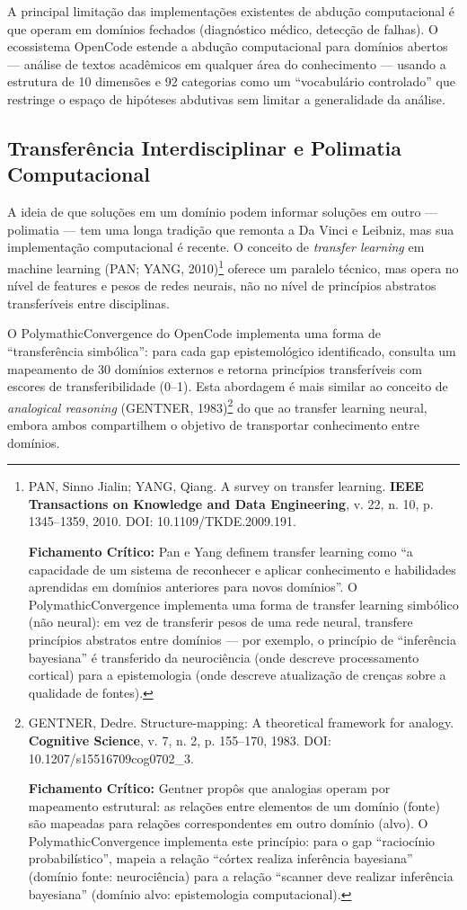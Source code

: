 A principal limitação das implementações existentes de abdução computacional é que operam em domínios fechados (diagnóstico médico, detecção de falhas). O ecossistema OpenCode estende a abdução computacional para domínios abertos --- análise de textos acadêmicos em qualquer área do conhecimento --- usando a estrutura de 10 dimensões e 92 categorias como um ``vocabulário controlado'' que restringe o espaço de hipóteses abdutivas sem limitar a generalidade da análise.

\subsection{Transferência Interdisciplinar e Polimatia Computacional}

A ideia de que soluções em um domínio podem informar soluções em outro --- polimatia --- tem uma longa tradição que remonta a Da Vinci e Leibniz, mas sua implementação computacional é recente. O conceito de \textit{transfer learning} em machine learning (PAN; YANG, 2010)\footnote{
  PAN, Sinno Jialin; YANG, Qiang. A survey on transfer learning. \textbf{IEEE Transactions on Knowledge and Data Engineering}, v. 22, n. 10, p. 1345--1359, 2010. DOI: 10.1109/TKDE.2009.191.

  \textbf{Fichamento Crítico:} Pan e Yang definem transfer learning como ``a capacidade de um sistema de reconhecer e aplicar conhecimento e habilidades aprendidas em domínios anteriores para novos domínios''. O PolymathicConvergence implementa uma forma de transfer learning simbólico (não neural): em vez de transferir pesos de uma rede neural, transfere princípios abstratos entre domínios --- por exemplo, o princípio de ``inferência bayesiana'' é transferido da neurociência (onde descreve processamento cortical) para a epistemologia (onde descreve atualização de crenças sobre a qualidade de fontes).
} oferece um paralelo técnico, mas opera no nível de features e pesos de redes neurais, não no nível de princípios abstratos transferíveis entre disciplinas.

O PolymathicConvergence do OpenCode implementa uma forma de ``transferência simbólica'': para cada gap epistemológico identificado, consulta um mapeamento de 30 domínios externos e retorna princípios transferíveis com escores de transferibilidade (0--1). Esta abordagem é mais similar ao conceito de \textit{analogical reasoning} (GENTNER, 1983)\footnote{
  GENTNER, Dedre. Structure-mapping: A theoretical framework for analogy. \textbf{Cognitive Science}, v. 7, n. 2, p. 155--170, 1983. DOI: 10.1207/s15516709cog0702\_3.

  \textbf{Fichamento Crítico:} Gentner propôs que analogias operam por mapeamento estrutural: as relações entre elementos de um domínio (fonte) são mapeadas para relações correspondentes em outro domínio (alvo). O PolymathicConvergence implementa este princípio: para o gap ``raciocínio probabilístico'', mapeia a relação ``córtex realiza inferência bayesiana'' (domínio fonte: neurociência) para a relação ``scanner deve realizar inferência bayesiana'' (domínio alvo: epistemologia computacional).
} do que ao transfer learning neural, embora ambos compartilhem o objetivo de transportar conhecimento entre domínios.

